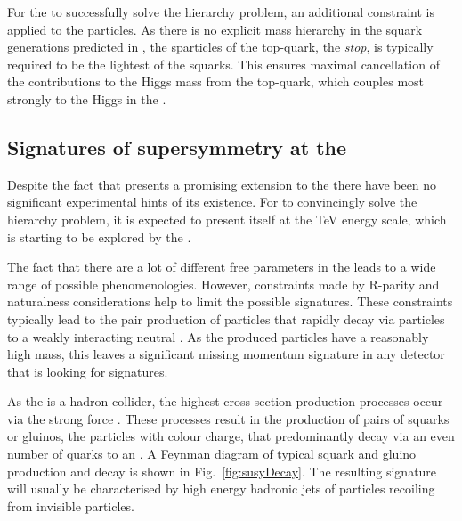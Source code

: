 For the \MSSM to successfully solve the hierarchy problem, an
additional constraint is applied to the \SUSY particles. As there is
no explicit mass hierarchy in the squark generations predicted in
\SUSY, the sparticles of the top-quark, the \emph{stop}, is typically
required to be the lightest of the squarks. This ensures maximal
cancellation of the contributions to the Higgs mass from the
top-quark, which couples most strongly to the Higgs in the \SM.

\subsection{Signatures of supersymmetry at the \LHC}

Despite the fact that \SUSY presents a promising extension to the \SM
there have been no significant experimental hints of its existence.
For
\SUSY to convincingly solve the hierarchy problem, it is expected to
present itself at the TeV energy scale, which is
starting to be explored by the \LHC. 

The fact that there are a lot of different free parameters in the
\MSSM leads to a wide range of possible \SUSY phenomenologies.
However, constraints made by R-parity and naturalness
considerations help to limit the possible signatures. These
constraints typically lead to the pair production of \SUSY particles
that rapidly decay via \SM particles to a weakly interacting neutral \LSP. 
As the produced \SUSY particles have a reasonably high mass, this
leaves a significant missing momentum signature in any detector that
is looking for \SUSY signatures.

As the \LHC is a hadron collider, the highest cross section \SUSY
production processes occur via the strong force \cite{Martin:1997ns}
\cite{SUSYxsections_NewAspectsof_pp_collisions}. These processes
result in the production of pairs of squarks or gluinos, the \SUSY
particles with colour charge, that predominantly decay via an even
number of \SM quarks to an \LSP. A Feynman diagram of typical squark
and gluino production and decay is shown in Fig.~\ref{fig:susyDecay}.
The resulting signature will usually be characterised by high energy
hadronic jets of \SM particles recoiling from invisible particles.

